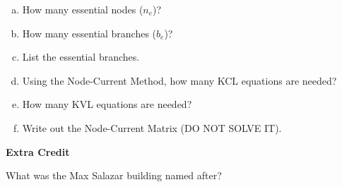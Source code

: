 \documentclass[12pt]{article}
\begin{document}
\begin{enumerate}[(a)]
\item How many essential nodes ($n_e$)?
\item How many essential branches ($b_e$)?
\item List the essential branches.
\item Using the Node-Current Method, how many KCL equations are needed?
\item How many KVL equations are needed?
\item Write out the Node-Current Matrix (DO NOT SOLVE IT).

\end{enumerate}

{\bf Extra Credit}

What was the Max Salazar building named after?
\end{document}
